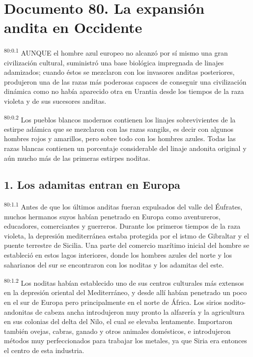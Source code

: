 \chapter{Documento 80. La expansión andita en Occidente}
\par
\textsuperscript{80:0.1} AUNQUE el hombre azul europeo no alcanzó por sí mismo una gran civilización cultural, suministró una base biológica impregnada de linajes adamizados; cuando éstos se mezclaron con los invasores anditas posteriores, produjeron una de las razas más poderosas capaces de conseguir una civilización dinámica como no había aparecido otra en Urantia desde los tiempos de la raza violeta y de sus sucesores anditas.

\par
\textsuperscript{80:0.2} Los pueblos blancos modernos contienen los linajes sobrevivientes de la estirpe adámica que se mezclaron con las razas sangiks, es decir con algunos hombres rojos y amarillos, pero sobre todo con los hombres azules. Todas las razas blancas contienen un porcentaje considerable del linaje andonita original y aún mucho más de las primeras estirpes noditas.

\section*{1. Los adamitas entran en Europa}
\par
\textsuperscript{80:1.1} Antes de que los últimos anditas fueran expulsados del valle del Éufrates, muchos hermanos suyos habían penetrado en Europa como aventureros, educadores, comerciantes y guerreros. Durante los primeros tiempos de la raza violeta, la depresión mediterránea estaba protegida por el istmo de Gibraltar y el puente terrestre de Sicilia. Una parte del comercio marítimo inicial del hombre se estableció en estos lagos interiores, donde los hombres azules del norte y los saharianos del sur se encontraron con los noditas y los adamitas del este.

\par
\textsuperscript{80:1.2} Los noditas habían establecido uno de sus centros culturales más extensos en la depresión oriental del Mediterráneo, y desde allí habían penetrado un poco en el sur de Europa pero principalmente en el norte de África. Los sirios nodito-andonitas de cabeza ancha introdujeron muy pronto la alfarería y la agricultura en sus colonias del delta del Nilo, el cual se elevaba lentamente. Importaron también ovejas, cabras, ganado y otros animales domésticos, e introdujeron métodos muy perfeccionados para trabajar los metales, ya que Siria era entonces el centro de esta industria.

